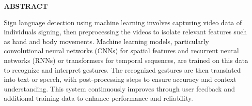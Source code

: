 \thispagestyle{plain}
\begin{flushright}
    \large \textbf{{ABSTRACT}}
\end{flushright}

\vspace{1\baselineskip}

\noindent{}
Sign language detection using machine learning involves capturing video data of individuals signing, then preprocessing the videos to isolate relevant features such as hand and body movements. Machine learning models, particularly convolutional neural networks (CNNs) for spatial features and recurrent neural networks (RNNs) or transformers for temporal sequences, are trained on this data to recognize and interpret gestures. The recognized gestures are then translated into text or speech, with post-processing steps to ensure accuracy and context understanding. This system continuously improves through user feedback and additional training data to enhance performance and reliability.